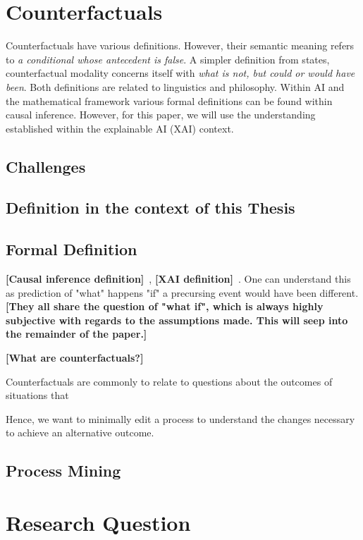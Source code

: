 \documentclass[12pt,a4paper,footinclude=true,headinclude=true]{report}
\newcommand{\attention}[1]{\color{red}\textbf{[#1]}\color{black}~}
\begin{document}
\section{Counterfactuals}

Counterfactuals have various definitions. However, their semantic meaning refers to \emph{a conditional whose antecedent is false}\autocite{_Counterfactual_}. A simpler definition from \citeauthor{starr_Counterfactuals_2021} states, counterfactual modality concerns itself with \emph{what is not, but could or would have been}.
Both definitions are related to linguistics and philosophy. Within AI and the mathematical framework various formal definitions can be found within causal inference\autocite{hitchcock_CausalModels_2020}. However, for this paper, we will use the understanding established within the explainable AI (XAI) context. 
\subsection{Challenges}
\subsection{Definition in the context of this Thesis}
\subsection{Formal Definition}


\attention{Causal inference definition}, \attention{XAI definition}. 
One can understand this as prediction of "what" happens "if" a precursing event would have been different.  
\attention{They all share the question of "what if", which is always highly subjective with regards to the assumptions made. This will seep into the remainder of the paper.}

\attention{What are counterfactuals?}

Counterfactuals are commonly to relate to questions about the outcomes of situations that  

Hence, we want to minimally edit a process to understand the changes necessary to achieve an alternative outcome.

\subsection{Process Mining}


\section{Research Question}
\end{document}
